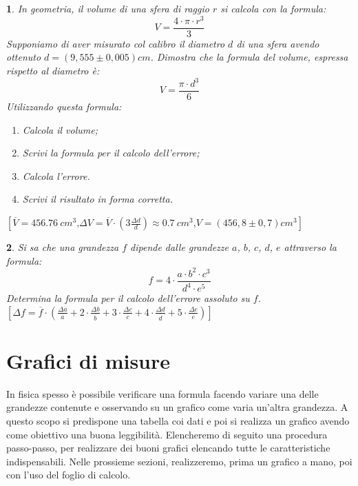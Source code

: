 \documentclass[12pt,a4paper,oneside]{book}
\theoremstyle{esercizio}
\newtheorem{esercizio}{}
\begin{document}
\begin{esercizio}
In geometria, il volume di una sfera di raggio $r$ si calcola con la formula:
\[
V=\frac{4\cdot\pi \cdot r^3}{3}
\] 
Supponiamo di aver misurato col calibro il diametro $d$ di una sfera avendo ottenuto $d=\left(9,555 \pm 0,005\right)\si{cm}$. Dimostra che la formula del volume, espressa rispetto al diametro è:
\[
V=\frac{\pi \cdot d^3}{6}
\]
Utilizzando questa formula:
\begin{enumerate}
\item[a)] Calcola il volume;
\item[b)] Scrivi la formula per il calcolo dell'errore;
\item[c)] Calcola l'errore.
\item[d)] Scrivi il risultato in forma corretta.
\end{enumerate}
 \hspace*{\fill}   $\left[\overline{V}=\SI{456.76}{cm^3}\text{,} \Delta V=\overline{V}\cdot\left(3\frac{\Delta d}{d}\right)\approx\SI{0.7}{cm^3}\text{,} V=\left(456,8 \pm 0,7 \right)\si{cm^3}\right] $
\end{esercizio}
\vspace{0.2cm}
\begin{esercizio}
Si sa che una grandezza $f$ dipende dalle grandezze $a$, $b$, $c$, $d$, $e$ attraverso la formula:
\[
f = 4 \cdot \frac{a\cdot b^2 \cdot c^3}{d^4 \cdot e^5}
\]
Determina la formula per il calcolo dell'errore assoluto su $f$.\\

\hspace*{\fill} $\left[\Delta f=\overline{f}\cdot\left(\frac{\Delta a}{\overline{a}}+ 2\cdot \frac{\Delta b}{\overline{b}} +3\cdot\frac{\Delta c}{\overline{c}} + 4\cdot \frac{\Delta d}{\overline{d}} + 5\cdot \frac{\Delta e}{\overline{e}}  \right)\right]$
\end{esercizio}

 \chapter{Grafici di misure}
In fisica spesso è possibile verificare una formula facendo variare una delle grandezze contenute e osservando su un grafico come varia un'altra grandezza. A questo scopo si predispone una tabella coi dati e poi si realizza un grafico avendo come obiettivo una buona leggibilità. Elencheremo di seguito una procedura passo-passo, per realizzare dei buoni grafici elencando tutte le caratteristiche indispensabili. Nelle prossieme sezioni, realizzeremo, prima un grafico a mano, poi con l'uso del foglio di calcolo.
\end{document}
